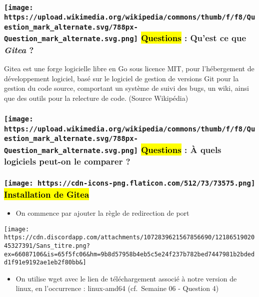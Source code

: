 \documentclass{report}
\begin{document}
\subsubsection[ \hl{Questions} : Qu'est ce que \emph{Gitea}
?]{\texorpdfstring{\protect\texttt{[image: https://upload.wikimedia.org/wikipedia/commons/thumb/f/f8/Question\_mark\_alternate.svg/788px-Question\_mark\_alternate.svg.png]}
\hl{Questions} : Qu'est ce que \emph{Gitea}
?}{drawing Questions : Qu'est ce que Gitea ?}}\label{drawing-questions-quest-ce-que-gitea}

Gitea est une forge logicielle libre en Go sous licence MIT, pour
l'hébergement de développement logiciel, basé sur le logiciel de gestion
de versions Git pour la gestion du code source, comportant un système de
suivi des bugs, un wiki, ainsi que des outils pour la relecture de code.
(Source Wikipédia)

\subsubsection[ \hl{Questions} : À quels logiciels peut-on le comparer
?]{\texorpdfstring{\protect\texttt{[image: https://upload.wikimedia.org/wikipedia/commons/thumb/f/f8/Question\_mark\_alternate.svg/788px-Question\_mark\_alternate.svg.png]}
\hl{Questions} : À quels logiciels peut-on le comparer
?}{drawing Questions : À quels logiciels peut-on le comparer ?}}\label{drawing-questions-uxe0-quels-logiciels-peut-on-le-comparer}

\subsubsection[ \hl{Installation de
Gitea}]{\texorpdfstring{\protect\texttt{[image: https://cdn-icons-png.flaticon.com/512/73/73575.png]}
\hl{Installation de
Gitea}}{drawing Installation de Gitea}}\label{drawing-installation-de-gitea}

\begin{itemize}
\tightlist
\item
  On commence par ajouter la règle de redirection de port
\end{itemize}

\texttt{[image: https://cdn.discordapp.com/attachments/1072839621567856690/1218651902045327391/Sans\_titre.png?ex=66087106\&is=65f5fc06\&hm=9b8d57958b4eb5c5e24f237b782bed7447981b2bdedd1f91e9192ae1eb2f80bb\&]}

\begin{itemize}
\tightlist
\item
  On utilise wget avec le lien de téléchargement associé à notre version
  de linux, en l'occurrence : linux-amd64 (cf.~Semaine 06 - Question 4)
\end{itemize}
\end{document}
